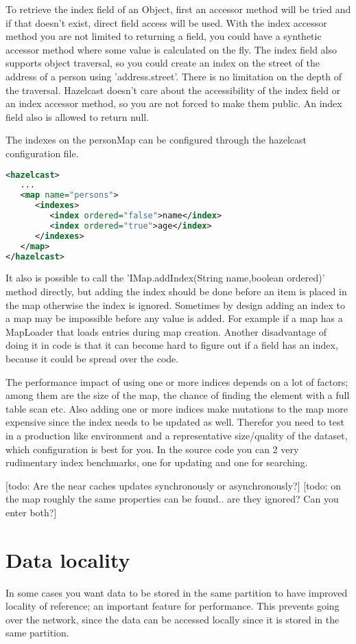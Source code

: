 To retrieve the index field of an Object, first an accessor method will be tried and if that doesn't exist, direct field access will be used. With the index accessor method you are not limited to returning a field, you could have a synthetic accessor method where some value is calculated on the fly. The index field also supports object traversal, so you could create an index on the street of the address of a person using 'address.street'. There is no limitation on the depth of the traversal. Hazelcast doesn't care about the accessibility of the index field or an index accessor method, so you are not forced to make them public. An index field also is allowed to return null.

The indexes on the personMap can be configured through the hazelcast configuration file. 
\begin{lstlisting}[language=xml]
<hazelcast>
   ...
   <map name="persons">
      <indexes>
         <index ordered="false">name</index>
         <index ordered="true">age</index>
      </indexes>
   </map>
</hazelcast>
\end{lstlisting}
It also is possible to call the 'IMap.addIndex(String name,boolean ordered)' method directly, but adding the index should be done before an item is placed in the map otherwise the index is ignored. Sometimes by design adding an index to a map may be impossible before any value is added. For example if a map has a MapLoader that loads entries during map creation. Another disadvantage of doing it in code is that it can become hard to figure out if a field has an index, because it could be spread over the code.

The performance impact of using one or more indices depends on a lot of factors; among them are the size of the map, the chance of finding the element with a full table scan etc. Also adding one or more indices make mutations to the map more expensive since the index needs to be updated as well. Therefor you need to test in a production like environment and a representative size/quality of the dataset, which configuration is best for you. In the source code you can 2 very rudimentary index benchmarks, one for updating and one for searching. 

[todo: Are the near caches updates synchronously or asynchronously?]
[todo: on the map roughly the same properties can be found.. are they ignored? Can you enter both?]

\section{Data locality}
In some cases you want data to be stored in the same partition to have improved locality of reference; an important feature for performance. This prevents going over the network, since the data can be accessed locally since it is stored in the same partition.

